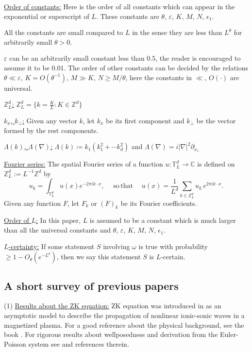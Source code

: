 \underline{Order of constants:} Here is the order of all constants which can appear in the exponential or superscript of $L$. These constants are $\theta$, $\varepsilon$, $K$, $M$, $N$, $\epsilon_1$.%

All the constants are small compared to $L$ in the sense they are less than $L^{\theta}$ for arbitrarily small $\theta>0$.

$\varepsilon$ can be an arbitrarily small constant less than $0.5$, the reader is encouraged to assume it to be $0.01$. The order of other constants can be decided by the relations $\theta\ll \varepsilon$, $K=O(\theta^{-1})$, $M\gg K$, $N\ge M/\theta$, here the constants in $\ll$, $O(\cdot)$ are universal. 

\underline{$\mathbb{Z}_L^d$:} $\mathbb{Z}_L^d= \{k=\frac{K}{L}:K\in \mathbb{Z}^d\}$

\underline{$k_x$, $k_{\perp}$:} Given any vector $k$, let $k_x$ be its first component and $k_{\perp}$ be the vector formed by the rest components. 

\underline{$\Lambda(k)$, $\Lambda(\nabla)$:} $\Lambda(k)\coloneqq k_{1}(k_1^2+\cdots k_d^2)$ and $\Lambda(\nabla) = i|\nabla|^2\partial_{x_1}$

\underline{Fourier series:} The spatial Fourier series of a function $u: \mathbb{T}_L^d \to \mathbb C$ is defined on $\mathbb{Z}^d_L:=L^{-1}\mathbb{Z}^{d}$ by
\begin{equation}\label{fourierset}
u_k=\int_{\mathbb{T}^d_L} u(x) e^{-2\pi i k\cdot x},\quad \mathrm{\; so \,that \;}\quad u(x)=\frac{1}{L^d}\sum_{k \in \mathbb{Z}^d_L} u_k \,e^{2\pi i k\cdot x}. 
\end{equation}
Given any function $F$, let $F_k$ or $(F)_k$ be its Fourier coefficients.

\underline{Order of $L$:} In this paper, $L$ is assumed to be a constant which is much larger than all the universal constants and $\theta$, $\varepsilon$, $K$, $M$, $N$, $\epsilon_1$. 

\underline{$L$-certainty:} If some statement $S$ involving $\omega$ is true with probability $\geq 1-O_{\theta}(e^{-L^\theta})$, then we say this statement $S$ is $L$-certain.


\subsection{A short survey of previous papers} (1) \underline{Results about the ZK equation:} ZK equation was introduced in \cite{ZK} as an asymptotic model to describe the propagation of nonlinear ionic-sonic waves in a magnetized plasma. For a good reference about the physical background, see the book \cite{Dbook}. For rigorous results about wellposedness and derivation from the Euler-Poisson system see \cite{LLS} and references therein.

